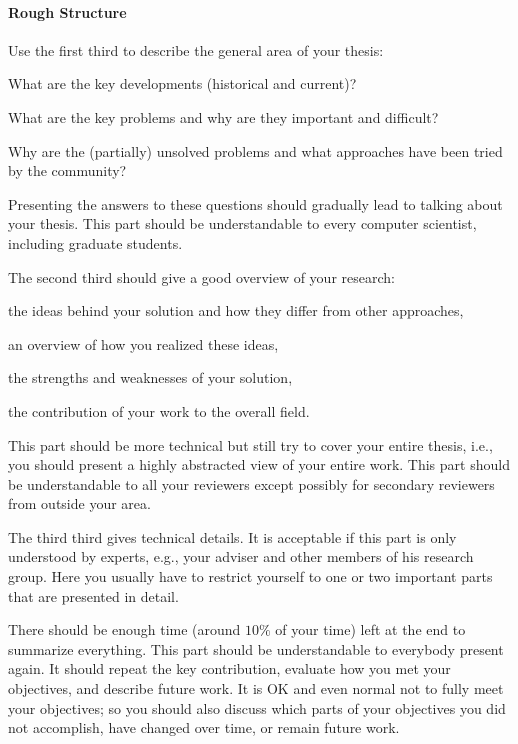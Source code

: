 \documentclass[12pt]{article}
\begin{document}
\paragraph{Rough Structure}
Use the first third to describe the general area of your thesis:
\begin{compactitem}
 \item What are the key developments (historical and current)?
 \item What are the key problems and why are they important and difficult?
 \item Why are the (partially) unsolved problems and what approaches have been tried by the community?
\end{compactitem}
Presenting the answers to these questions should gradually lead to talking about your thesis.
This part should be understandable to every computer scientist, including graduate students.
\medskip

The second third should give a good overview of your research:
\begin{compactitem}
 \item the ideas behind your solution and how they differ from other approaches,
 \item an overview of how you realized these ideas,
 \item the strengths and weaknesses of your solution,
 \item the contribution of your work to the overall field.
\end{compactitem}
This part should be more technical but still try to cover your entire thesis, i.e., you should present a highly abstracted view of your entire work.
This part should be understandable to all your reviewers except possibly for secondary reviewers from outside your area.
\medskip

The third third gives technical details.
It is acceptable if this part is only understood by experts, e.g., your adviser and other members of his research group.
Here you usually have to restrict yourself to one or two important parts that are presented in detail.
\medskip

There should be enough time (around $10\%$ of your time) left at the end to summarize everything.
This part should be understandable to everybody present again.
It should repeat the key contribution, evaluate how you met your objectives, and describe future work.
It is OK and even normal not to fully meet your objectives; so you should also discuss which parts of your objectives you did not accomplish, have changed over time, or remain future work.
\medskip
\end{document}
